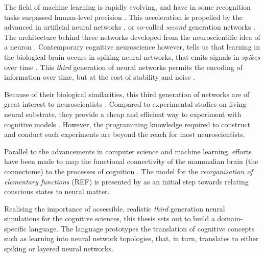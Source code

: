 \documentclass[report.tex]{subfiles}
\begin{document}
The field of machine learning is rapidly evolving, and have in
some recognition tasks surpassed human-level precision
\autocite{Schmidhuber2014}.
This acceleration is propelled by the advanced in artificial neural
networks \autocite{Rumelhart1988, Schmidhuber2014, Nilsson2009}, or
so-called \textit{second} generation networks \cite{Maass1997}.
The architecture behind these networks developed from the neuroscientific
idea of a neuron \autocite{Nilsson2009, Russel2007}.
Contemporary cognitive neuroscience however, tells us that learning in
the biological brain occurs in spiking neural networks, that emits
signals in \textit{spikes} over time \cite{Dayan2001, Eliasmith2004}.
This \textit{third} generation of neural networks permits the encoding
of information over time, but at the cost of stability and 
noise \autocite{Maass1997}.

Because of their biological similarities, this third generation of
networks are of great interest to neuroscientists
\autocite{Dayan2001,Bruderle2011,Eliasmith2015}.
Compared to experimental studies on living neural substrate,
they provide a cheap and efficient way to experiment with cognitive 
models \autocite{Eliasmith2015}.
However, the programming knowledge required to construct and conduct
such experiments are beyond the reach for most neuroscientists.

Parallel to the advancements in computer science and machine learning,
efforts have been made to map the functional connectivity of the mammalian
brain (the connectome) to the processes of cognition \autocite{Mogensen2018}.
The model for the \textit{reorganisation of elementary functions} (REF)
is presented by \textcite{Mogensen2017} as an initial step towards
relating conscious states to neural matter.


\vskip10pt
Realising the importance of accessible, realistic \textit{third} 
generation neural simulations for the cognitive sciences, this thesis
sets out to build a domain-specific language.
The language prototypes the translation of cognitive concepts 
such as learning into neural network topologies, that, in turn,
translates to either spiking or layered neural networks.
\end{document}
